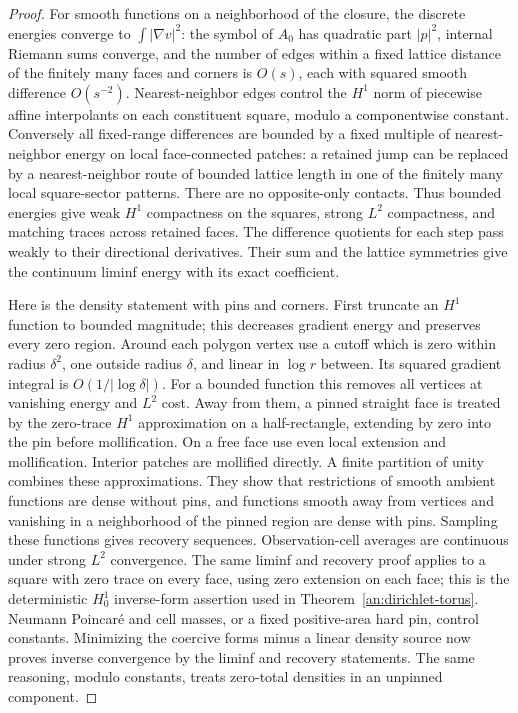 \begin{proof}
For smooth functions on a neighborhood of the closure,
the discrete energies converge to $\int|\nabla v|^2$:
the symbol of $A_0$ has quadratic part $|p|^2$, internal
Riemann sums converge, and the number of edges within a
fixed lattice distance of the finitely many faces and
corners is $O(s)$, each with squared smooth difference
$O(s^{-2})$.  Nearest-neighbor edges control the
$H^1$ norm of piecewise affine interpolants on each
constituent square, modulo a componentwise constant.
Conversely all fixed-range differences are bounded by a
fixed multiple of nearest-neighbor energy on local
face-connected patches: a retained jump can be replaced
by a nearest-neighbor route of bounded lattice length
in one of the finitely many local square-sector patterns.
There are no opposite-only contacts.  Thus bounded
energies give weak $H^1$ compactness on the squares,
strong $L^2$ compactness, and matching traces across
retained faces.  The difference quotients for each
step pass weakly to their directional derivatives.
Their sum and the lattice symmetries give the
continuum liminf energy with its exact coefficient.

Here is the density statement with pins and corners.
First truncate an $H^1$ function to bounded magnitude;
this decreases gradient energy and preserves every
zero region.  Around each polygon vertex use a cutoff
which is zero within radius $\delta^2$, one outside
radius $\delta$, and linear in $\log r$ between.
Its squared gradient integral is $O(1/|\log\delta|)$.
For a bounded function this removes all vertices at
vanishing energy and $L^2$ cost.  Away from them, a
pinned straight face is treated by the zero-trace
$H^1$ approximation on a half-rectangle, extending by
zero into the pin before mollification.  On a free
face use even local extension and mollification.
Interior patches are mollified directly.  A finite
partition of unity combines these approximations.
They show that restrictions of smooth ambient
functions are dense without pins, and functions
smooth away from vertices and vanishing in a
neighborhood of the pinned region are dense with
pins.  Sampling these functions gives recovery
sequences.  Observation-cell averages are continuous
under strong $L^2$ convergence.  The same liminf and recovery
proof applies to a square with zero trace on every face, using
zero extension on each face; this is the deterministic
$H_0^1$ inverse-form assertion used in
Theorem~\ref{an:dirichlet-torus}.  Neumann Poincar\'e
and cell masses, or a fixed positive-area hard pin,
control constants.  Minimizing the coercive forms
minus a linear density source now proves inverse
convergence by the liminf and recovery statements.
The same reasoning, modulo constants, treats zero-total
densities in an unpinned component.


\end{proof}
